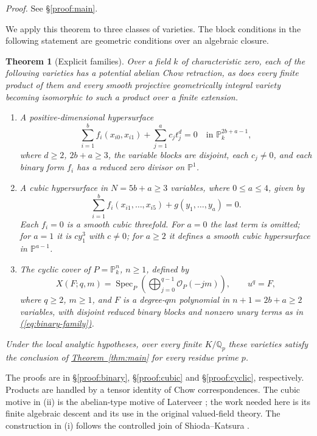 \documentclass[11pt,a4paper]{article}
\newtheorem{theorem}{Theorem}[section]
\theoremstyle{definition}
\theoremstyle{remark}\newtheorem{remark}[theorem]{Remark}
\numberwithin{equation}{section}
\newcommand{\Q}{\mathbb Q}\newcommand{\R}{\mathbb R}\newcommand{\C}{\mathbb C}
\newcommand{\PP}{\mathbb P}\newcommand{\LL}{\mathbb L}
\newcommand{\Spec}{\operatorname{Spec}}\newcommand{\Bl}{\operatorname{Bl}}
\newcommand{\subref}[1]{\hyperref[#1]{\textcolor{sectionlink}{\S\ref*{#1}}}}
\newcommand{\thmref}[1]{\hyperref[#1]{\textcolor{resultlink}{Theorem~\ref*{#1}}}}
\renewcommand{\eqref}[1]{\hyperref[#1]{\textcolor{equationlink}{(\ref*{#1})}}}
\newcommand{\proofloc}[1]{\emph{Proof.} See \subref{#1}.}
\begin{document}
\proofloc{proof:main}

We apply this theorem to three classes of varieties. The block conditions in
the following statement are geometric conditions over an algebraic closure.

\begin{theorem}[Explicit families]\label{thm:families}
Over a field $k$ of characteristic zero, each of the following varieties
has a potential abelian Chow retraction, as does every finite product of
them and every smooth projective geometrically integral variety becoming
isomorphic to such a product over a finite extension.
\begin{enumerate}[label=\textup{(\roman*)}]
\item A positive-dimensional hypersurface
\begin{equation}\label{eq:binary-family}
 \sum_{i=1}^{b}f_i(x_{i0},x_{i1})+\sum_{j=1}^{a}c_jt_j^d=0
 \quad\text{in }\PP^{2b+a-1}_k,
\end{equation}
where $d\ge2$, $2b+a\ge3$, the variable blocks are disjoint, each
$c_j\ne0$, and each binary form $f_i$ has a reduced zero divisor on $\PP^1$.
\item A cubic hypersurface in $N=5b+a\ge3$ variables, where
$0\le a\le4$, given by
\begin{equation}\label{eq:cubic-family}
       \sum_{i=1}^{b}f_i(x_{i1},\ldots,x_{i5})+g(y_1,\ldots,y_a)=0.
\end{equation}
Each $f_i=0$ is a smooth cubic threefold. For $a=0$ the last term is
omitted; for $a=1$ it is $cy_1^3$ with $c\ne0$; for $a\ge2$ it defines a smooth
cubic hypersurface in $\PP^{a-1}$.
\item The cyclic cover of $P=\PP^n_k$, $n\ge1$, defined by
\begin{equation}\label{eq:cyclic-family}
 X(F;q,m)=\Spec_P\left(\bigoplus_{j=0}^{q-1}\mathcal O_P(-jm)\right),
 \qquad u^q=F,
\end{equation}
where $q\ge2$, $m\ge1$, and $F$ is a degree-$qm$ polynomial in
$n+1=2b+a\ge2$ variables, with disjoint reduced binary blocks and
nonzero unary terms as in \eqref{eq:binary-family}.
\end{enumerate}
Under the local analytic hypotheses, over every finite $K/\Q_p$ these varieties satisfy the
conclusion of \thmref{thm:main} for every residue prime $p$.
\end{theorem}

The proofs are in \subref{proof:binary}, \subref{proof:cubic} and
\subref{proof:cyclic}, respectively. Products are handled by a tensor
identity of Chow correspondences. The cubic motive in (ii) is the
abelian-type motive of Laterveer \cite[Theorem 5]{Laterveer}; the work
needed here is its finite algebraic descent and its use in the original
valued-field theory. The construction in (i) follows the controlled join
of Shioda--Katsura \cite[Remark 1.10]{SK}.
\end{document}
